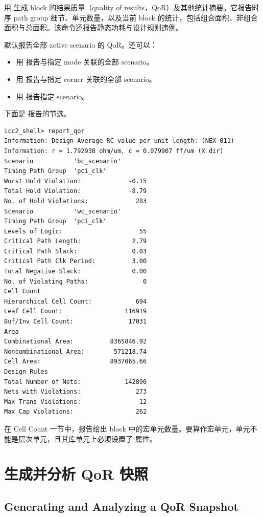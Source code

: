 用  生成 block 的结果质量（quality of results，QoR）及其他统计摘要。它报告时序 path group 细节、单元数量，以及当前 block 的统计，包括组合面积、非组合面积与总面积。该命令还报告静态功耗与设计规则违例。

默认报告全部 active scenario 的 QoR。还可以：
\begin{itemize}
  \item 用  报告与指定 mode 关联的全部 scenario。
  \item 用  报告与指定 corner 关联的全部 scenario。
  \item 用  报告指定 scenario。
\end{itemize}

下面是  报告的节选。
\begin{lstlisting}[caption={report\_qor 报告示例}]
icc2_shell> report_qor
Information: Design Average RC value per unit length: (NEX-011)
Information: r = 1.792938 ohm/um, c = 0.079907 ff/um (X dir)
Scenario           'bc_scenario'
Timing Path Group  'pci_clk'
Worst Hold Violation:             -0.15
Total Hold Violation:             -8.79
No. of Hold Violations:             283
Scenario           'wc_scenario'
Timing Path Group  'pci_clk'
Levels of Logic:                     55
Critical Path Length:              2.79
Critical Path Slack:               0.03
Critical Path Clk Period:          3.00
Total Negative Slack:              0.00
No. of Violating Paths:               0
Cell Count
Hierarchical Cell Count:            694
Leaf Cell Count:                 116919
Buf/Inv Cell Count:               17031
Area
Combinational Area:          8365846.92
Noncombinational Area:        571218.74
Cell Area:                   8937065.66
Design Rules
Total Number of Nets:            142890
Nets with Violations:               273
Max Trans Violations:                12
Max Cap Violations:                 262
\end{lstlisting}

在 Cell Count 一节中，报告给出 block 中的宏单元数量。要算作宏单元，单元不能是层次单元，且其库单元上必须设置了  属性。

\section{生成并分析 QoR 快照}
\subsection*{Generating and Analyzing a QoR Snapshot}

